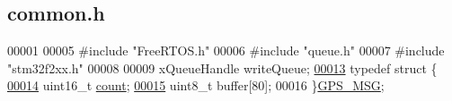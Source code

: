 \hypertarget{common_8h_source}{\subsection{common.\+h}
\label{common_8h_source}
}

\begin{DoxyCode}
00001 
00005 \textcolor{preprocessor}{#include "FreeRTOS.h"}
00006 \textcolor{preprocessor}{#include "queue.h"}
00007 \textcolor{preprocessor}{#include "stm32f2xx.h"}
00008 
00009 xQueueHandle writeQueue;
\hypertarget{common_8h_source_l00013}{}\hyperlink{structGPS__MSG}{00013} \textcolor{keyword}{typedef} \textcolor{keyword}{struct }\{
\hypertarget{common_8h_source_l00014}{}\hyperlink{structGPS__MSG_a4f0c127ec8708885192496df14c31a71}{00014}   uint16\_t \hyperlink{structGPS__MSG_a4f0c127ec8708885192496df14c31a71}{count}; 
\hypertarget{common_8h_source_l00015}{}\hyperlink{structGPS__MSG_ac486c996a8a7a5edd1752baaea5b4571}{00015}   uint8\_t buffer[80];
00016 \}\hyperlink{structGPS__MSG}{GPS\_MSG};
\end{DoxyCode}
